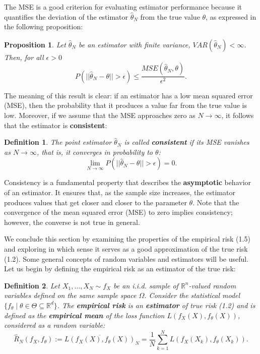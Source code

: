 \documentclass{report}
\newtheorem{definition}{Definition}[chapter]
\newtheorem{proposition}{Proposition}[chapter]
\begin{document}
The MSE is a good criterion for evaluating estimator performance because it quantifies the deviation of the estimator $\hat{\theta}_N$ from the true value $\theta$, as expressed in the following proposition:

\begin{proposition}
Let $\hat{\theta}_N$ be an estimator with finite variance, $VAR(\hat{\theta}_N) < \infty$. Then, for all $\epsilon > 0$
\begin{equation}
P(||\hat{\theta}_N -\theta|| > \epsilon) \leq \frac{MSE(\hat{\theta}_N,\theta)}{\epsilon ^ 2}.
\end{equation}
\end{proposition}

The meaning of this result is clear: if an estimator has a low mean squared error (MSE), then the probability that it produces a value far from the true value is low. Moreover, if we assume that the MSE approaches zero as $N \to \infty$, it follows that the estimator is \textbf{consistent}:

\begin{definition}
The point estimator $\hat{\theta}_N$ is called \textbf{consistent} if its MSE vanishes as $N \to \infty$, that is, it converges in probability to $\theta$:
\begin{equation}
\lim_{N \to \infty} P(||\hat{\theta}_N -\theta|| > \epsilon) = 0.
\end{equation}
\end{definition}

Consistency is a fundamental property that describes the \textbf{asymptotic} behavior of an estimator. It ensures that, as the sample size increases, the estimator produces values that get closer and closer to the parameter $\theta$. Note that the convergence of the mean squared error (MSE) to zero implies consistency; however, the converse is not true in general.

We conclude this section by examining the properties of the empirical risk (1.5) and exploring in which sense it serves as a good approximation of the true risk (1.2). Some general concepts of random variables and estimators will be useful. Let us begin by defining the empirical risk as an estimator of the true risk:

\begin{definition}
Let $X_1,\dots,X_N \sim f_X$ be an i.i.d. sample of $\mathbb{R}^n$-valued random variables defined on the same sample space $\Omega$. Consider the statistical model $\{f_\theta \mid \theta \in \Theta \subseteq \mathbb{R}^d\}$. The \textbf{empirical risk} is an \textbf{estimator} of true risk (1.2) and is defined as the \textbf{empirical mean} of the loss function $L(f_X(X), f_\theta(X))$, considered as a random variable:
\begin{equation}
\hat{R}_N(f_X,f_\theta) := \overline{L(f_X(X),f_\theta(X))}_N = \frac{1}{N}\sum_{k=1}^{N}L(f_X(X_k),f_\theta(X_k)).
\end{equation}
\end{definition}
\end{document}
